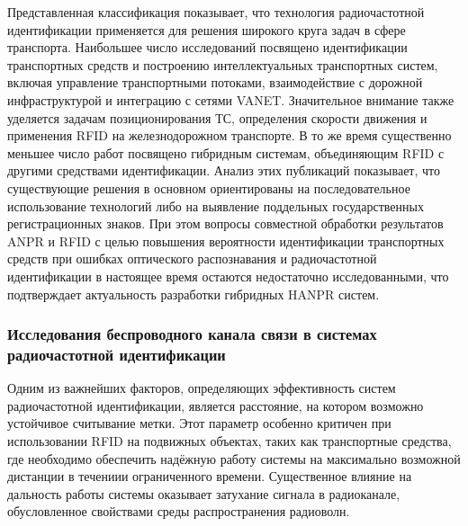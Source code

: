 \documentclass[12pt]{article}
\theoremstyle{definition}
\begin{document}
Представленная классификация показывает, что технология радиочастотной идентификации применяется для решения широкого круга задач в сфере транспорта. Наибольшее число исследований посвящено идентификации транспортных средств и построению интеллектуальных транспортных систем, включая управление транспортными потоками, взаимодействие с дорожной инфраструктурой и интеграцию с сетями VANET. Значительное внимание также уделяется задачам позиционирования ТС, определения скорости движения и применения RFID на железнодорожном транспорте. В то же время существенно меньшее число работ посвящено гибридным системам, объединяющим RFID с другими средствами идентификации. Анализ этих публикаций показывает, что существующие решения в основном ориентированы на последовательное использование технологий либо на выявление поддельных государственных регистрационных знаков. При этом вопросы совместной обработки результатов ANPR и RFID с целью повышения вероятности идентификации транспортных средств при ошибках оптического распознавания и радиочастотной идентификации в настоящее время остаются недостаточно исследованными, что подтверждает актуальность разработки гибридных HANPR систем.

\subsubsection{Исследования беспроводного канала связи в системах радиочастотной идентификации}

Одним из важнейших факторов, определяющих эффективность систем радиочастотной идентификации, является расстояние, на котором возможно устойчивое считывание метки. Этот параметр особенно критичен при использовании RFID на подвижных объектах, таких как транспортные средства, где необходимо обеспечить надёжную работу системы на максимально возможной дистанции в течениии ограниченного времени. Существенное влияние на дальность работы системы оказывает затухание сигнала в радиоканале, обусловленное свойствами среды распространения радиоволн.
\end{document}
